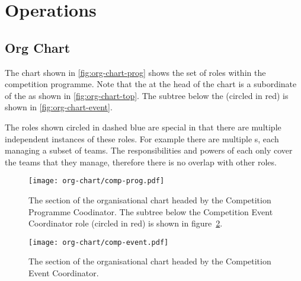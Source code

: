 \section{Operations}
\label{sec:comp-prog-ops}

\subsection{Org Chart}

The chart shown in \autoref{fig:org-chart-prog} shows the set of roles within the competition programme. Note that the  at the head of the chart is a subordinate of the  as shown in \autoref{fig:org-chart-top}. The subtree below the  (circled in red) is shown in \autoref{fig:org-chart-event}.

The roles shown circled in dashed blue are special in that there are multiple independent instances of these roles. For example there are multiple s, each managing a subset of teams. The responsibilities and powers of each  only cover the teams that they manage, therefore there is no overlap with other roles.

\begin{figure}[h]
  \begin{center}
    \texttt{[image: org-chart/comp-prog.pdf]}
  \end{center}
  \caption{\label{fig:org-chart-prog}The section of the organisational chart headed by the Competition Programme Coodinator.  The subtree below the Competition Event Coordinator role (circled in red) is shown in figure~\ref{fig:org-chart-event}.}
\end{figure}

\begin{figure}[h]
  \begin{center}
    \texttt{[image: org-chart/comp-event.pdf]}
  \end{center}
  \caption{\label{fig:org-chart-event}The section of the organisational chart headed by the Competition Event Coordinator.}
\end{figure}

